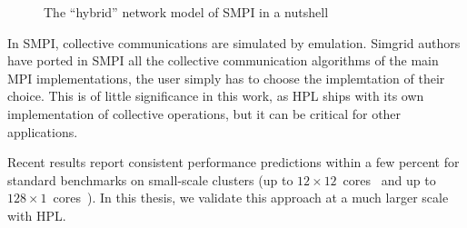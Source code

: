         \begin{figure}[htpb]
            \centering
            \caption{The ``hybrid'' network model of SMPI in a nutshell~\cite{smpi}}%
            \label{fig:smpi_model}
        \end{figure}

        In SMPI, collective communications are simulated by emulation. Simgrid authors have ported in SMPI all the
        collective communication algorithms of the main MPI implementations, the user simply has to choose the
        implemtation of their choice. This is of little significance in this work, as HPL ships with its own
        implementation of collective operations, but it can be critical for other applications.

        Recent results report consistent performance predictions within a few percent for standard benchmarks on
        small-scale clusters (up to \(12\times12\) cores~\cite{heinrich:hal-01523608} and up to
        \(128\times1\) cores~\cite{smpi}). In this thesis, we validate this approach at a much larger scale with HPL.


